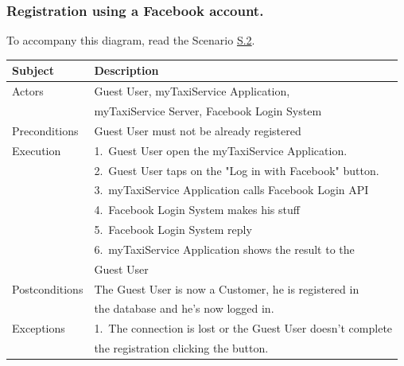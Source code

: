 \subsubsection{Registration using a Facebook account.}

	To accompany this diagram, read the Scenario \hyperref[sec:FacebookCustomerRegistrationScenario]{S.2}.

				\begin{table}[htpb]
					\centering
					\label{tab:FacebookCustomerRegistrationDiagramTable}
					\begin{tabularx}{\textwidth}{lp{9cm}}
						\hline
						\hline
							\textbf{Subject}
						& 
							\textbf{Description}\\
						\hline
							Actors	       &  Guest User, myTaxiService Application, \\
							               &  myTaxiService Server, Facebook Login System\\
						\hline
							Preconditions  &  Guest User must not be already registered\\
						\hline
							Execution      &  1.~Guest User open the myTaxiService Application.\\
										   &  2.~Guest User taps on the "Log in with Facebook" button.\\
										   &  3.~myTaxiService Application calls Facebook Login API\\
										   &  4.~Facebook Login System makes his stuff\\
										   &  5.~Facebook Login System reply\\
										   &  6.~myTaxiService Application shows the result to the \\
										   &     Guest User\\
						\hline
							Postconditions &  The Guest User is now a Customer, he is registered in \\ 
										   &  the database and he's now logged in.\\
						\hline
							Exceptions     &  1.~The connection is lost or the Guest User doesn't complete\\ 
										   &     the registration clicking the button.\\
									
						\hline
						\hline
					\end{tabularx}
				\end{table}

